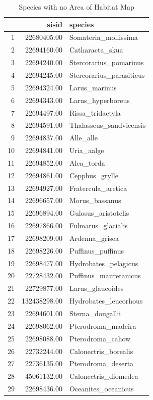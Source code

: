\begin{table}[h]
\centering
\begin{tabular}{rrl}
  \hline
 & sisid & species \\ 
  \hline
1 & 22680405.00 & Somateria\_mollissima \\ 
   \hline
2 & 22694160.00 & Catharacta\_skua \\ 
   \hline
3 & 22694240.00 & Stercorarius\_pomarinus \\ 
   \hline
4 & 22694245.00 & Stercorarius\_parasiticus \\ 
   \hline
5 & 22694324.00 & Larus\_marinus \\ 
   \hline
6 & 22694343.00 & Larus\_hyperboreus \\ 
   \hline
7 & 22694497.00 & Rissa\_tridactyla \\ 
   \hline
8 & 22694591.00 & Thalasseus\_sandvicensis \\ 
   \hline
9 & 22694837.00 & Alle\_alle \\ 
   \hline
10 & 22694841.00 & Uria\_aalge \\ 
   \hline
11 & 22694852.00 & Alca\_torda \\ 
   \hline
12 & 22694861.00 & Cepphus\_grylle \\ 
   \hline
13 & 22694927.00 & Fratercula\_arctica \\ 
   \hline
14 & 22696657.00 & Morus\_bassanus \\ 
   \hline
15 & 22696894.00 & Gulosus\_aristotelis \\ 
   \hline
16 & 22697866.00 & Fulmarus\_glacialis \\ 
   \hline
17 & 22698209.00 & Ardenna\_grisea \\ 
   \hline
18 & 22698226.00 & Puffinus\_puffinus \\ 
   \hline
19 & 22698477.00 & Hydrobates\_pelagicus \\ 
   \hline
20 & 22728432.00 & Puffinus\_mauretanicus \\ 
   \hline
21 & 22729877.00 & Larus\_glaucoides \\ 
   \hline
22 & 132438298.00 & Hydrobates\_leucorhous \\ 
   \hline
23 & 22694601.00 & Sterna\_dougallii \\ 
   \hline
24 & 22698062.00 & Pterodroma\_madeira \\ 
   \hline
25 & 22698088.00 & Pterodroma\_cahow \\ 
   \hline
26 & 22732244.00 & Calonectris\_borealis \\ 
   \hline
27 & 22736135.00 & Pterodroma\_deserta \\ 
   \hline
28 & 45061132.00 & Calonectris\_diomedea \\ 
   \hline
29 & 22698436.00 & Oceanites\_oceanicus \\ 
   \hline
\end{tabular}
\caption{Species with no Area of Habitat Map} 
\label{tab:no_aoh_map}
\end{table}

